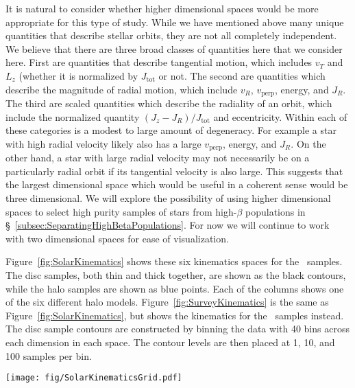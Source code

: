 It is natural to consider whether higher dimensional spaces would be more appropriate for this type of study. While we have mentioned above many unique quantities that describe stellar orbits, they are not all completely independent. We believe that there are three broad classes of quantities here that we consider here. First are quantities that describe tangential motion, which includes $v_{T}$ and $L_{z}$ (whether it is normalized by $J_\mathrm{tot}$ or not. The second are quantities which describe the magnitude of radial motion, which include $v_{R}$, $v_\mathrm{perp}$, energy, and $J_{R}$. The third are scaled quantities which describe the radiality of an orbit, which include the normalized quantity $(J_{z}-J_{R})/J_\mathrm{tot}$ and eccentricity. Within each of these categories is a modest to large amount of degeneracy. For example a star with high radial velocity likely also has a large $v_\mathrm{perp}$, energy, and $J_{R}$. On the other hand, a star with large radial velocity may not necessarily be on a particularly radial orbit if its tangential velocity is also large. This suggests that the largest dimensional space which would be useful in a coherent sense would be three dimensional. We will explore the possibility of using higher dimensional spaces to select high purity samples of stars from high-$\beta$ populations in \S~\ref{subsec:SeparatingHighBetaPopulations}. For now we will continue to work with two dimensional spaces for ease of visualization.


Figure~\ref{fig:SolarKinematics} shows these six kinematics spaces for the \solar\ samples. The disc samples, both thin and thick together, are shown as the black contours, while the halo samples are shown as blue points. Each of the columns shows one of the six different halo models. Figure~\ref{fig:SurveyKinematics} is the same as Figure~\ref{fig:SolarKinematics}, but shows the kinematics for the \survey\ samples instead. The disc sample contours are constructed by binning the data with 40 bins across each dimension in each space. The contour levels are then placed at 1, 10, and 100 samples per bin. 

\begin{figure*}
	\centering
	\texttt{[image: fig/SolarKinematicsGrid.pdf]}
	\caption{Kinematics of the six \solar\ samples. Each of the columns shows one of the subsets of the \solar\ sample, which vary by the $\beta$ of the halo component (labelled). The blue points show the halo samples while the black contours show the disc samples, combining both thin and thick. \textit{Top row:} Radial and tangential velocities; \textit{second from top:} Toomre diagram; \textit{third from top:} energy and $L_{z}$; \textit{third from bottom:} $\sqrt{J_{R}}$ and $L_{z}$; \textit{second from bottom:} eccentricity and $L_{z}$; \textit{bottom row:} action diamond. The units (unlabelled) are as follows: velocities are in km~s$^{-1}$, actions and angular momenta are in kpc~km~s$^{-1}$, and energies are in km$^{2}$~s$^{-2}$.} \label{fig:SolarKinematics}
\end{figure*}


